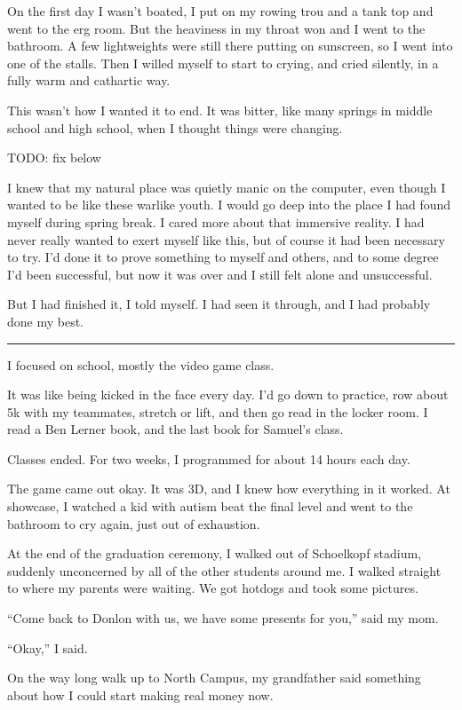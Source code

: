 On the first day I wasn't boated, I put on my rowing trou and a tank top and
went to the erg room.  But the heaviness in my throat won and I went to the
bathroom.  A few lightweights were still there putting on sunscreen, so I went
into one of the stalls.  Then I willed myself to start to crying, and cried
silently, in a fully warm and cathartic way.  

This wasn't how I wanted it to end.  It was bitter, like many springs in middle
school and high school, when I thought things were changing.  

TODO: fix below

I knew that my natural place was quietly manic on the computer, even though I
wanted to be like these warlike youth.  I would go deep into the place I had
found myself during spring break.  I cared more about that immersive reality.  I
had never really wanted to exert myself like this, but of course it had been
necessary to try.  I'd done it to prove something to myself and others, and to
some degree I'd been successful, but now it was over and I still felt alone and
unsuccessful.

But I had finished it, I told myself.  I had seen it through, and I had probably
done my best.

\plainfancybreak{12pt}{2}{* * *}

I focused on school, mostly the video game class.

It was like being kicked in the face every day.  I'd go down to practice, row
about 5k with my teammates, stretch or lift, and then go read in the locker
room.  I read a Ben Lerner book, and the last book for Samuel's class.

Classes ended.  For two weeks, I programmed for about 14 hours each day.  

The game came out okay.  It was 3D, and I knew how everything in it worked.  At
showcase, I watched a kid with autism beat the final level and went to the
bathroom to cry again, just out of exhaustion.

At the end of the graduation ceremony, I walked out of Schoelkopf stadium,
suddenly unconcerned by all of the other students around me.  I walked straight
to where my parents were waiting.  We got hotdogs and took some pictures.  

``Come back to Donlon with us, we have some presents for you,'' said my mom. 

``Okay,'' I said.  

On the way long walk up to North Campus, my grandfather said something about how
I could start making real money now.


